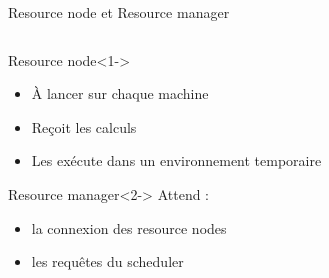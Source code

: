 \documentclass{beamer}
\begin{document}
\begin{frame}{Resource node et Resource manager}
\begin{columns}
\begin{column}[r]{0.5\linewidth}
        \begin{block}{Resource node}<1->
            \begin{itemize}
                \item À lancer sur chaque machine
                \item Reçoit les calculs
                \item Les exécute dans un environnement temporaire
            \end{itemize}
        \end{block}
        \begin{block}{Resource manager}<2->
             Attend :
             \begin{itemize}
                     \item la connexion des resource nodes
                     \item les requêtes du scheduler
             \end{itemize}
        \end{block}
	\end{column}
	\end{columns}
\end{frame}
\end{document}
